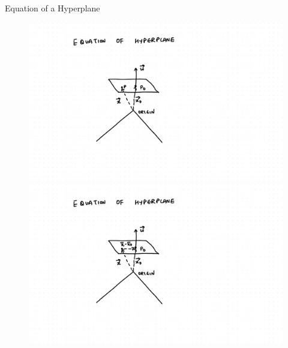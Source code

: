 \documentclass{beamer}
\begin{document}
\begin{frame}{Equation of a Hyperplane}
\begin{figure}
\begin{overprint}
 \includegraphics[scale=0.3]{./SVM/Svm-15.pdf}
 \includegraphics[scale=0.3]{./SVM/Svm-16.pdf}
\end{overprint}
\end{figure}


\end{frame}
\end{document}
